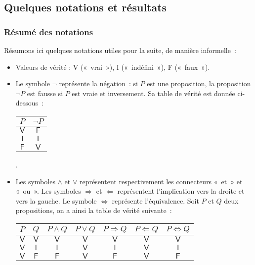 \subsection{Quelques notations et résultats}

\subsubsection{Résumé des notations}

Résumons ici quelques notations utiles pour la suite, de manière informelle :

\begin{itemize}
\item Valeurs de vérité : $\mathrm{V}$ (« vrai »), $\mathrm{I}$ (« indéfini »), $\mathrm{F}$ (« faux »).
\item Le symbole $\neg$ représente la négation : si $P$ est une proposition, la proposition $\neg P$ est fausse si $P$ est vraie et inversement. 
    Sa table de vérité est donnée ci-dessous : 
\begin{center}
\begin{tabular}{c | c}
    $P$ & $\neg P$ \\
    \hline
    $\mathsf{V}$ & $\mathsf{F}$ \\
    $\mathsf{I}$ & $\mathsf{I}$ \\
    $\mathsf{F}$ & $\mathsf{V}$ \\
\end{tabular} .
\end{center}
\item Les symboles $\wedge$ et $\vee$ représentent respectivement les connecteurs « et » et « ou ». 
Les symboles $\Rightarrow$ et $\Leftarrow$ représentent l'implication vers la droite et vers la gauche. 
Le symbole $\Leftrightarrow$ représente l'équivalence. 
    Soit $P$ et $Q$ deux propositions, on a ainsi la table de vérité suivante : 
\begin{center}
\begin{tabular}{c c | c c c c c}
    $P$ & $Q$ & $P \wedge Q$ & $P \vee Q$ & $P \Rightarrow Q$ & $P \Leftarrow Q$ & $P \Leftrightarrow Q$ \\
    \hline
    $\mathsf{V}$ & $\mathsf{V}$ & $\mathsf{V}$ & $\mathsf{V}$ & $\mathsf{V}$ & $\mathsf{V}$ & $\mathsf{V}$ \\
    $\mathsf{V}$ & $\mathsf{I}$ & $\mathsf{I}$ & $\mathsf{V}$ & $\mathsf{I}$ & $\mathsf{V}$ & $\mathsf{I}$ \\
    $\mathsf{V}$ & $\mathsf{F}$ & $\mathsf{F}$ & $\mathsf{V}$ & $\mathsf{F}$ & $\mathsf{V}$ & $\mathsf{F}$ \\

\end{tabular}
\end{center}
\end{itemize}
